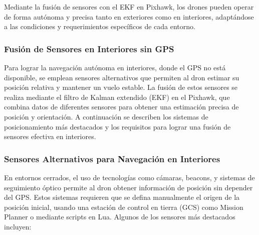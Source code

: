     Mediante la fusión de sensores con el EKF en Pixhawk, los drones pueden operar de forma autónoma y precisa tanto en exteriores como en interiores, adaptándose a las condiciones y requerimientos específicos de cada entorno.
    

    \subsubsection{Fusión de Sensores en Interiores sin GPS}
    Para lograr la navegación autónoma en interiores, donde el GPS no está disponible, se emplean sensores alternativos que permiten al dron estimar su posición relativa y mantener un vuelo estable. La fusión de estos sensores se realiza mediante el filtro de Kalman extendido (EKF) en el Pixhawk, que combina datos de diferentes sensores para obtener una estimación precisa de posición y orientación. A continuación se describen los sistemas de posicionamiento más destacados y los requisitos para lograr una fusión de sensores efectiva en interiores.
    
    \subsubsection{Sensores Alternativos para Navegación en Interiores}
    En entornos cerrados, el uso de tecnologías como cámaras, beacons, y sistemas de seguimiento óptico permite al dron obtener información de posición sin depender del GPS. Estos sistemas requieren que se defina manualmente el origen de la posición inicial, usando una estación de control en tierra (GCS) como Mission Planner o mediante scripts en Lua. Algunos de los sensores más destacados incluyen:
    
